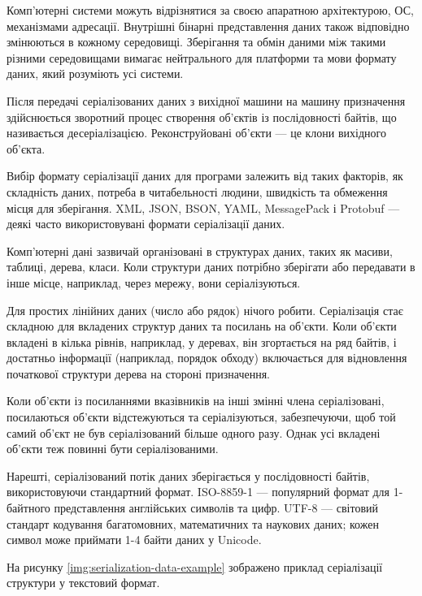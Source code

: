 \documentclass{lib/styles/default-style}
\begin{document}
    Комп'ютерні системи можуть відрізнятися за своєю апаратною архітектурою, ОС,
    механізмами адресації. Внутрішні бінарні представлення даних також відповідно
    змінюються в кожному середовищі. Зберігання та обмін даними між такими різними середовищами
    вимагає нейтрального для платформи та мови формату даних, який розуміють усі системи.

    Після передачі серіалізованих даних з вихідної машини на машину призначення
    здійснюється зворотний процес створення об'єктів із послідовності байтів, що називається десеріалізацією.
    Реконструйовані об'єкти --- це клони вихідного об'єкта.

    Вибір формату серіалізації даних для програми залежить
    від таких факторів, як складність даних, потреба в читабельності людини, швидкість
    та обмеження місця для зберігання. XML, JSON, BSON, YAML, MessagePack і Protobuf --- деякі
    часто використовувані формати серіалізації даних.


    Комп'ютерні дані зазвичай організовані в структурах даних, таких як масиви,
    таблиці, дерева, класи. Коли структури даних потрібно зберігати або передавати
    в інше місце, наприклад, через мережу, вони серіалізуються.

    Для простих лінійних даних (число або рядок) нічого робити.
    Серіалізація стає складною для вкладених структур даних та посилань на об'єкти.
    Коли об'єкти вкладені в кілька рівнів, наприклад, у деревах, він згортається на ряд
    байтів, і достатньо інформації (наприклад, порядок обходу) включається для відновлення
    початкової структури дерева на стороні призначення.

    Коли об'єкти із посиланнями вказівників
    на інші змінні члена серіалізовані, посилаються об'єкти відстежуються та
    серіалізуються, забезпечуючи, щоб той самий об’єкт не був серіалізований більше одного разу.
    Однак усі вкладені об'єкти теж повинні бути серіалізованими.

    Нарешті, серіалізований потік даних зберігається у послідовності байтів,
    використовуючи стандартний формат.
    ISO-8859-1 --- популярний формат для 1-байтного представлення англійських символів та цифр.
    UTF-8 --- світовий стандарт кодування багатомовних, математичних та наукових даних; кожен символ може приймати 1-4 байти даних у Unicode.

    На рисунку \ref{img:serialization-data-example} зображено приклад серіалізації структури у текстовий формат.

    
\end{document}
